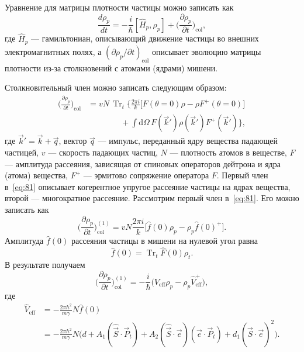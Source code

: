 \documentclass[11pt,a4paper]{article}
\DeclareMathOperator{\Tr}{Tr}
\newcommand{\hvec}[1]{\hat{\vec{#1}}}
\begin{document}
Уравнение для матрицы плотности частицы можно записать как~\cite{BaryShekht96,BaryShirvel05}
\begin{equation}
\frac{d\rho_p}{dt}
=-\frac{i}{\hbar}[\hat{H}_p,\rho_p]
+\Biggl(\frac{\partial\rho_p}{\partial t}\Biggr)_{\mathrm{col}},
\label{eq:80}
\end{equation}
где $\hat{H}_p$ --- гамильтониан, описывающий движение частицы во внешних
электромагнитных полях, а $(\partial\rho_p/\partial t)_{\mathrm{col}}$
описывает эволюцию матрицы плотности из-за столкновений с атомами (ядрами)
мишени.

Столкновительный член можно записать следующим образом:
\begin{equation}
\begin{aligned}
\Biggl(\frac{\partial\rho_p}{\partial t}\Biggr)_{\mathrm{col}}
&=v N\,\Tr_t\Biggl\{
\frac{2\pi i}{k}\bigl[F(\theta=0)\rho-\rho F^+(\theta=0)\bigr]
\\
&\qquad\qquad
+\int\mathrm{d}\Omega\, F(\vec{k}')\rho(\vec{k}')F^+(\vec{k}')
\Biggr\},
\end{aligned}
\label{eq:81}
\end{equation}
где $\vec{k}'=\vec{k}+\vec{q}$, вектор $\vec{q}$ --- импульс, переданный
ядру вещества падающей частицей, $v$ --- скорость падающих частиц,
$N$ --- плотность атомов в веществе, $F$ --- амплитуда рассеяния,
зависящая от спиновых операторов дейтрона и ядра (атома) вещества,
$F^+$ --- эрмитово сопряжение оператора $F$. Первый член в~\eqref{eq:81}
описывает когерентное упругое рассеяние частицы на ядрах вещества,
второй --- многократное рассеяние. Рассмотрим первый член в~\eqref{eq:81}.
Его можно записать как
\begin{equation}
\Biggl(\frac{\partial\rho_p}{\partial t}\Biggr)_{\mathrm{col}}^{(1)}
=v N\frac{2\pi i}{k}\bigl[\hat{f}(0)\rho_p-\rho_p\hat{f}(0)^+\bigr].
\label{eq:83}
\end{equation}
Амплитуда $\hat{f}(0)$ рассеяния частицы в мишени на нулевой угол равна
\begin{equation}
\hat{f}(0)=\Tr_t\hat{F}(0)\rho_t.
\label{eq:84}
\end{equation}
В результате получаем
\begin{equation}
\Biggl(\frac{\partial\rho_p}{\partial t}\Biggr)_{\mathrm{col}}^{(1)}
=-\frac{i}{\hbar}\bigl(\hat{V}_{\mathrm{eff}}\rho_p-\rho_p\hat{V}_{\mathrm{eff}}^+\bigr),
\label{eq:85}
\end{equation}
где
\begin{equation}
\begin{aligned}
\hat{V}_{\mathrm{eff}}
&=-\frac{2\pi\hbar^2}{m\gamma}N\hat{f}(0)\\
&=-\frac{2\pi\hbar^2}{m\gamma}N\bigl(
d+A_1(\hvec{S}\cdot\vec{P}_t)+A_2(\hvec{S}\cdot\vec{e})(\vec{e}\cdot\vec{P}_t)
+d_1(\hvec{S}\cdot\vec{e})^2
\bigr).
\end{aligned}
\label{eq:86}
\end{equation}
\end{document}
